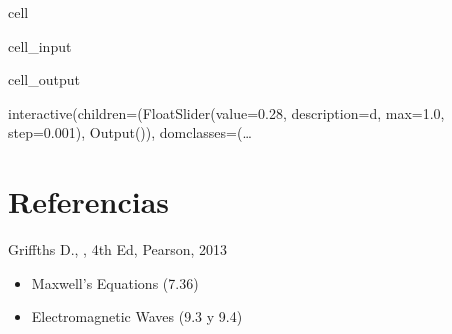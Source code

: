 \documentclass[letterpaper,10pt,english]{jupyterBook}
\begin{document}
\begin{sphinxuseclass}{cell}\begin{sphinxVerbatimInput}

\begin{sphinxuseclass}{cell_input}
\begin{sphinxVerbatim}[commandchars=\\\{\}]
   

 
     
\end{sphinxVerbatim}

\end{sphinxuseclass}\end{sphinxVerbatimInput}
\begin{sphinxVerbatimOutput}

\begin{sphinxuseclass}{cell_output}
\begin{sphinxVerbatim}[commandchars=\\\{\}]
interactive(children=(FloatSlider(value=0.28, description=\PYGZsq{}d\PYGZsq{}, max=1.0, step=0.001), Output()), \PYGZus{}dom\PYGZus{}classes=(…
\end{sphinxVerbatim}

\end{sphinxuseclass}\end{sphinxVerbatimOutput}

\end{sphinxuseclass}

\section{Referencias}
\label{\detokenize{2_ondas_EM_en_la_materia/2_ondas_EM_en_la_materia:referencias}}
\sphinxAtStartPar
Griffths D., , 4th Ed, Pearson, 2013
\begin{itemize}
\item {} 
 Maxwell’s Equations (7.36)

\item {} 
 Electromagnetic Waves (9.3 y 9.4)

\end{itemize}
\end{document}
